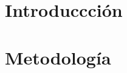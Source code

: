 \documentclass{article}
\begin{document}
\thispagestyle{plain}


\begin{multicols}{2}
    \section{Introduccción}

    \section{Metodología}

\end{multicols}
\end{document}
